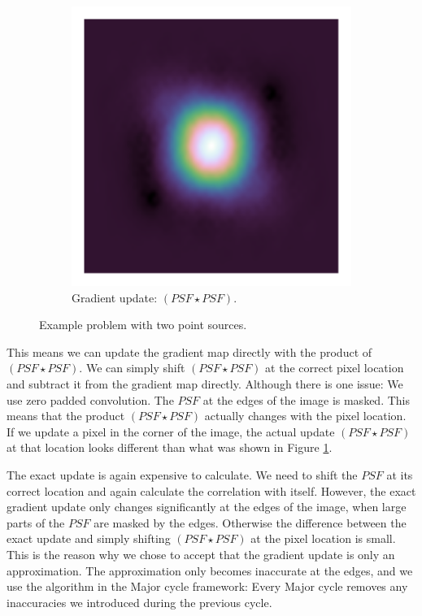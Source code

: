 \begin{figure}[!h]
\begin{subfigure}[b]{0.3\linewidth}
		\includegraphics[width=\linewidth, clip, trim= 0.25in 0.25in 0.25in 0.25in]{./chapters/03.cd/simulated/psfSquared.png}
		\caption{Gradient update: $(PSF \star PSF)$.}
		\label{cd:efficient:update:psf}
	\end{subfigure}
	\caption{Example problem with two point sources.}
	\label{cd:efficient:update:figure}
\end{figure}

This means we can update the gradient map directly with the product of $(PSF \star PSF)$. We can simply shift $(PSF \star PSF)$ at the correct pixel location and subtract it from the gradient map directly. Although there is one issue: We use zero padded convolution. The $PSF$ at the edges of the image is masked. This means that the product $(PSF \star PSF)$ actually changes with the pixel location. If we update a pixel in the corner of the image, the actual update $(PSF \star PSF)$ at that location looks different than what was shown in Figure \ref{cd:efficient:update:psf}.

The exact update is again expensive to calculate. We need to shift the $PSF$ at its correct location and again calculate the correlation with itself. However, the exact gradient update only changes significantly at the edges of the image, when large parts of the $PSF$ are masked by the edges. Otherwise the difference between the exact update and simply shifting $(PSF \star PSF)$ at the pixel location is small. This is the reason why we chose to accept that the gradient update is only an approximation. The approximation only becomes inaccurate at the edges, and we use the algorithm in the Major cycle framework: Every Major cycle removes any inaccuracies we introduced during the previous cycle.  

